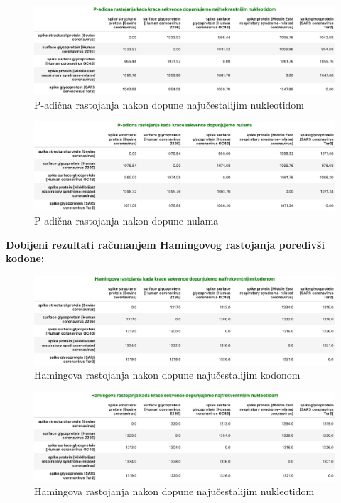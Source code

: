 \documentclass[a4paper,12pt]{article}
\begin{document}
\begin{figure}[h!]
  \centering
  \includegraphics[width=1.0\textwidth]{slika13.jpeg}
  \caption{P-adična rastojanja nakon dopune najučestalijim nukleotidom}
  \label{fig:my_label}
\end{figure}

\begin{figure}[h!]
  \centering
  \includegraphics[width=1.0\textwidth]{slika14.jpeg}
  \caption{P-adična rastojanja nakon dopune nulama}
  \label{fig:my_label}
\end{figure}

\bigskip
\noindent
\textbf{Dobijeni rezultati računanjem Hamingovog rastojanja poredivši kodone:}
\bigskip

\begin{figure}[h!]
  \centering
  \includegraphics[width=1.0\textwidth]{slika15.jpeg}
  \caption{Hamingova rastojanja nakon dopune najučestalijim kodonom}
  \label{fig:my_label}
\end{figure}

\begin{figure}[h!]
  \centering
  \includegraphics[width=1.0\textwidth]{slika16.jpeg}
  \caption{Hamingova rastojanja nakon dopune najučestalijim nukleotidom}
  \label{fig:my_label}
\end{figure}
\end{document}

